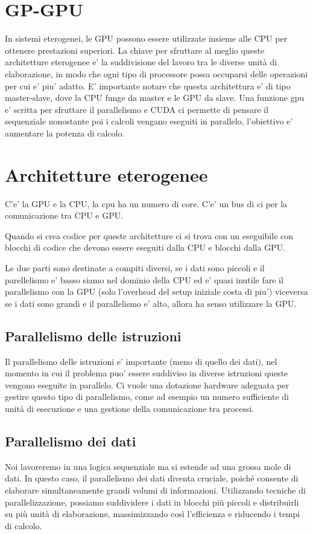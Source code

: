 \section{GP-GPU}
In sistemi eterogenei, le GPU possono essere utilizzate insieme alle CPU per ottenere prestazioni superiori. La chiave per sfruttare al meglio queste architetture eterogenee e' la suddivisione del lavoro tra le diverse unità di elaborazione, in modo che ogni tipo di processore possa occuparsi delle operazioni per cui e' piu' adatto. E' importante notare che questa architettura e' di tipo master-slave, dove la CPU funge da master e le GPU da slave.
Una funzione gpu e' scritta per sfruttare il parallelismo e CUDA ci permette di pensare il sequenziale nonostante poi i calcoli vengano eseguiti in parallelo, l'obiettivo e' aumentare la potenza di calcolo.

\section{Architetture eterogenee}
C'e' la GPU e la CPU, la cpu ha un numero di core. C'e' un bus di ci per la comunicazione tra CPU e GPU.

Quando si crea codice per queste architetture ci si trova con un eseguibile con blocchi di codice che devono essere eseguiti dalla CPU e blocchi dalla GPU.

Le due parti sono destinate a compiti diversi, se i dati sono piccoli e il parellelismo e' basso siamo nel dominio della CPU ed e' quasi inutile fare il parallelismo con la GPU (solo l'overhead del setup iniziale costa di piu') viceversa se i dati sono grandi e il parallelismo e' alto, allora ha senso utilizzare la GPU.

\subsection{Parallelismo delle istruzioni}
Il parallelismo delle istruzioni e' importante (meno di quello dei dati), nel momento in cui il problema puo' essere suddiviso in diverse istruzioni queste vengono eseguite in parallelo. Ci vuole una dotazione hardware adeguata per gestire questo tipo di parallelismo, come ad esempio un numero sufficiente di unità di esecuzione e una gestione della comunicazione tra processi.

\subsection{Parallelismo dei dati}
Noi lavoreremo in una logica sequenziale ma si estende ad una grossa mole di dati. In questo caso, il parallelismo dei dati diventa cruciale, poiché consente di elaborare simultaneamente grandi volumi di informazioni. Utilizzando tecniche di parallelizzazione, possiamo suddividere i dati in blocchi più piccoli e distribuirli su più unità di elaborazione, massimizzando così l'efficienza e riducendo i tempi di calcolo.

